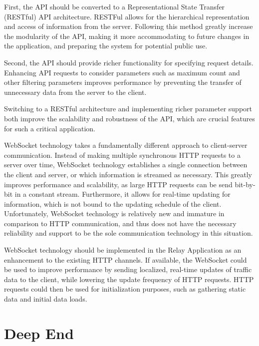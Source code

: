 \documentclass{report}
\begin{document}
First, the API should be converted to a Representational State Transfer (RESTful) API architecture. RESTFul allows for the hierarchical representation and access of information from the server. Following this method greatly increase the modularity of the API, making it more accommodating to future changes in the application, and preparing the system for potential public use.

Second, the API should provide richer functionality for specifying request details. Enhancing API requests to consider parameters such as maximum count and other filtering parameters improves performance by preventing the transfer of unnecessary data from the server to the client.

Switching to a RESTful architecture and implementing richer parameter support both improve the scalability and robustness of the API, which are crucial features for such a critical application.

WebSocket technology takes a fundamentally different approach to client-server communication. Instead of making multiple synchronous HTTP requests to a server over time, WebSocket technology establishes a single connection between the client and server, or which information is streamed as necessary. This greatly improves performance and scalability, as large HTTP requests can be send bit-by-bit in a constant stream. Furthermore, it allows for real-time updating for information, which is not bound to the updating schedule of the client. Unfortunately, WebSocket technology is relatively new and immature in comparison to HTTP communication, and thus does not have the necessary reliability and support to be the sole communication technology in this situation.

WebSocket technology should be implemented in the Relay Application as an enhancement to the existing HTTP channels. If available, the WebSocket could be used to improve performance by sending localized, real-time updates of traffic data to the client, while lowering the update frequency of HTTP requests. HTTP requests could then be used for initialization purposes, such as gathering static data and initial data loads.

\section{Deep End}
\end{document}

